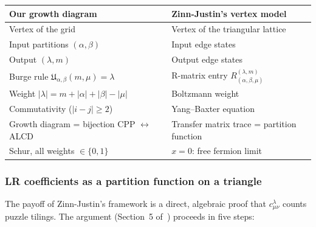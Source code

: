 \documentclass[11pt]{article}
\theoremstyle{plain}
\theoremstyle{definition}
\theoremstyle{remark}
\begin{document}
\begin{center}
\renewcommand{\arraystretch}{1.4}
\begin{tabular}{l|l}
  \textbf{Our growth diagram}
    & \textbf{Zinn-Justin's vertex model} \\
  \hline
  Vertex of the grid
    & Vertex of the triangular lattice \\
  Input partitions $(\alpha, \beta)$
    & Input edge states \\
  Output $(\lambda, m)$
    & Output edge states \\
  Burge rule $\mathfrak{U}_{\alpha,\beta}(m,\mu) = \lambda$
    & R-matrix entry $R^{(\lambda,m)}_{(\alpha,\beta,\mu)}$ \\
  Weight $|\lambda| = m + |\alpha| + |\beta| - |\mu|$
    & Boltzmann weight \\
  Commutativity ($|i - j| \geq 2$)
    & Yang--Baxter equation \\
  Growth diagram = bijection CPP $\leftrightarrow$ ALCD
    & Transfer matrix trace = partition function \\
  Schur, all weights $\in \{0,1\}$
    & $x = 0$: free fermion limit
\end{tabular}
\end{center}

\subsubsection*{LR coefficients as a partition function on a triangle}

The payoff of Zinn-Justin's framework is a direct, algebraic
proof that $c^\lambda_{\mu\nu}$ counts puzzle tilings.
The argument (Section~5 of~\cite{zinn-justin-2009}) proceeds
in five steps:
\end{document}
